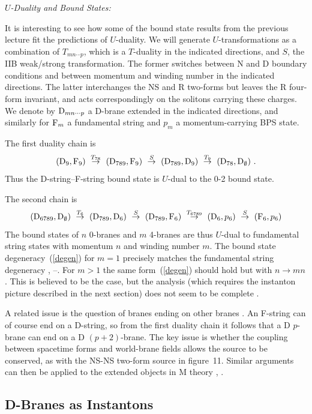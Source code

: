 \documentclass[12pt]{article}
\def\be{\begin{equation}}
\def\ee{\end{equation}}
\def\rD{{\rm D}}
\def\rF{{\rm F}}
\begin{document}
{\it $U$-Duality and Bound States:}

It is interesting to see how some of the bound state results from the 
previous lecture fit the predictions of $U$-duality.  We will generate
$U$-transformations as a combination of $T_{mn\cdots p}$, which is a
$T$-duality in the indicated directions, and $S$, the IIB weak/strong
transformation.  The former switches between N and D boundary conditions and
between momentum and winding number in the indicated directions.  The latter
interchanges the NS and R two-forms but leaves the R four-form invariant, and
acts correspondingly on the solitons carrying these charges.  We denote by
$\rD_{mn\cdots p}$ a D-brane extended in the indicated directions, and
similarly for $\rF_m$ a fundamental string and $p_m$ a momentum-carrying BPS
state.

The first duality chain is
\be
(\rD_9,\rF_9)\ \stackrel{T_{78}}{\to}\ (\rD_{789},\rF_9)
\ \stackrel{S}{\to}\ (\rD_{789},\rD_9)
\ \stackrel{T_{9}}{\to}\ (\rD_{78},\rD_{\emptyset})\ .
\ee
Thus the D-string--F-string bound state is $U$-dual to the 0-2 bound state.

The second chain is
\be
(\rD_{6789},\rD_{\emptyset})\ \stackrel{T_{6}}{\to}\ (\rD_{789},\rD_6)
\ \stackrel{S}{\to}\ (\rD_{789},\rF_6)
\ \stackrel{T_{6789}}{\to}\ (\rD_{6},p_6)
\ \stackrel{S}{\to}\ (\rF_{6},p_6)
\ee
The bound states of $n$ 0-branes and $m$ 4-branes are thus $U$-dual to
fundamental string states with momentum $n$ and winding number $m$.  The
bound state degeneracy~(\ref{degen}) for $m=1$ precisely matches the
fundamental string
degeneracy \cite{vafwit}, \cite{senbound2}--\cite{vafa2}.
For $m>1$ the same form~(\ref{degen}) should hold but with $n \to mn$.  This
is believed to be the case, but the analysis (which requires the
instanton picture described in the next section) does not seem to be
complete \cite{vafa2}.

A related issue is the question of branes ending on other
branes \cite{andyopen}.  An F-string can of course end on a D-string, so from
the first duality chain it follows that a D $p$-brane can end on a D
$(p+2)$-brane.  The key issue is whether the coupling between
spacetime forms and world-brane fields allows the source to be conserved, as
with the NS-NS two-form source in figure~11.  Similar arguments can then be
applied to the extended objects in M
theory \cite{andyopen}, \cite{towndf}.

\subsection{D-Branes as Instantons}
\end{document}
